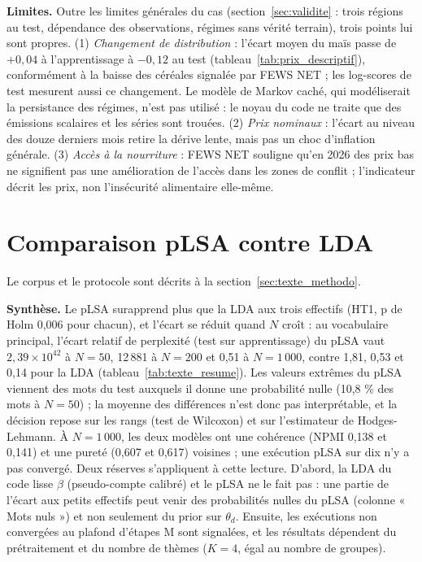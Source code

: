 \textbf{Limites. }Outre les limites générales du cas (section~\ref{sec:validite} : trois régions au test, dépendance des observations, régimes sans vérité terrain), trois points lui sont propres. (1) \emph{Changement de distribution} : l'écart moyen du maïs passe de $+0{,}04$ à l'apprentissage à $-0{,}12$ au test (tableau~\ref{tab:prix_descriptif}), conformément à la baisse des céréales signalée par FEWS NET ; les log-scores de test mesurent aussi ce changement. Le modèle de Markov caché, qui modéliserait la persistance des régimes, n'est pas utilisé : le noyau du code ne traite que des émissions scalaires et les séries sont trouées. (2) \emph{Prix nominaux} : l'écart au niveau des douze derniers mois retire la dérive lente, mais pas un choc d'inflation générale. (3) \emph{Accès à la nourriture} : FEWS NET souligne qu'en 2026 des prix bas ne signifient pas une amélioration de l'accès dans les zones de conflit ; l'indicateur décrit les prix, non l'insécurité alimentaire elle-même.


\section{Comparaison pLSA contre LDA}\label{sec:res_texte}
Le corpus et le protocole sont décrits à la section~\ref{sec:texte_methodo}.


\textbf{Synthèse.} Le pLSA surapprend plus que la LDA aux trois effectifs (HT1, p de Holm 0,006 pour chacun), et l'écart se réduit quand $N$ croît : au vocabulaire principal, l'écart relatif de perplexité (test sur apprentissage) du pLSA vaut $2{,}39 \times 10^{42}$ à $N = 50$, 12\,881 à $N = 200$ et 0,51 à $N = 1\,000$, contre 1,81, 0,53 et 0,14 pour la LDA (tableau~\ref{tab:texte_resume}). Les valeurs extrêmes du pLSA viennent des mots du test auxquels il donne une probabilité nulle (10,8 \% des mots à $N = 50$) ; la moyenne des différences n'est donc pas interprétable, et la décision repose sur les rangs (test de Wilcoxon) et sur l'estimateur de Hodges-Lehmann. À $N = 1\,000$, les deux modèles ont une cohérence (NPMI 0,138 et 0,141) et une pureté (0,607 et 0,617) voisines ; une exécution pLSA sur dix n'y a pas convergé. Deux réserves s'appliquent à cette lecture. D'abord, la LDA du code lisse $\beta$ (pseudo-compte calibré) et le pLSA ne le fait pas : une partie de l'écart aux petits effectifs peut venir des probabilités nulles du pLSA (colonne « Mots nuls ») et non seulement du prior sur $\theta_d$. Ensuite, les exécutions non convergées au plafond d'étapes M sont signalées, et les résultats dépendent du prétraitement et du nombre de thèmes ($K=4$, égal au nombre de groupes).

